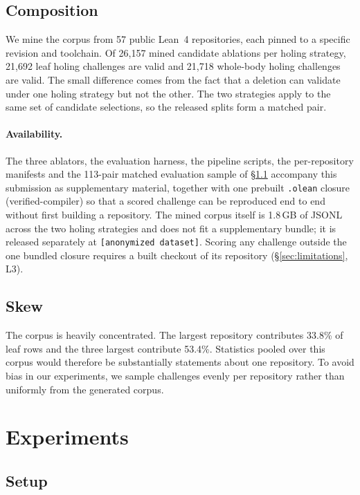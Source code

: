 \documentclass{article}
\newcommand{\anonurl}{\texttt{[anonymized dataset]}}
\begin{document}
\subsection{Composition}

We mine the corpus from 57 public Lean~4 repositories, each pinned to a specific revision and toolchain. Of 26{,}157 mined candidate ablations per holing strategy, 21{,}692 leaf holing challenges are valid and 21{,}718 whole-body holing challenges are valid. The small difference comes from the fact that a deletion can validate under one holing strategy but not the other. The two strategies apply to the same set of candidate selections, so the released splits form a matched pair.

\paragraph{Availability.} The three ablators, the evaluation harness, the pipeline
scripts, the per-repository manifests and the 113-pair matched evaluation sample of
\S\ref{sec:setup} accompany this submission as supplementary material, together with one
prebuilt \texttt{.olean} closure (verified-compiler) so that a scored challenge can be
reproduced end to end without first building a repository. The mined corpus itself is
1.8\,GB of JSONL across the two holing strategies and does not fit a supplementary bundle;
it is released separately at \anonurl. Scoring any challenge outside the one bundled
closure requires a built checkout of its repository (\S\ref{sec:limitations}, L3).

\subsection{Skew}
\label{sec:skew}

The corpus is heavily concentrated. The largest repository contributes 33.8\% of leaf rows and the three largest contribute 53.4\%. Statistics pooled over this corpus would therefore be substantially statements about one repository. To avoid bias in our experiments, we sample challenges evenly per repository rather than uniformly from the generated corpus.

\section{Experiments}
\label{sec:experiments}

\subsection{Setup}
\label{sec:setup}
\end{document}
